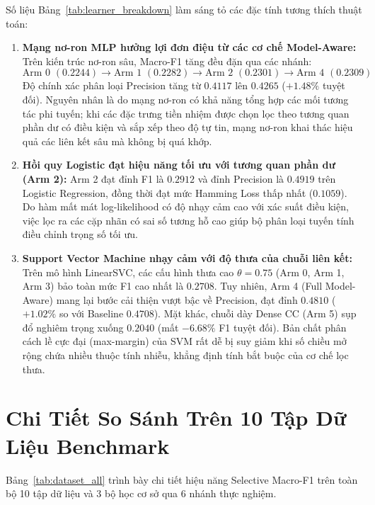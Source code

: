 \documentclass[11pt,a4paper]{article}
\begin{document}
Số liệu Bảng~\ref{tab:learner_breakdown} làm sáng tỏ các đặc tính tương thích thuật toán:
\begin{enumerate}[leftmargin=*]
  \item \textbf{Mạng nơ-ron MLP hưởng lợi đơn điệu từ các cơ chế Model-Aware:} 
  Trên kiến trúc nơ-ron sâu, Macro-F1 tăng đều đặn qua các nhánh:
  $$\text{Arm 0 } (0.2244) \to \text{Arm 1 } (0.2282) \to \text{Arm 2 } (0.2301) \to \text{Arm 4 } (\mathbf{0.2309})$$
  Độ chính xác phân loại Precision tăng từ $0.4117$ lên $\mathbf{0.4265}$ ($+1.48\%$ tuyệt đối). Nguyên nhân là do mạng nơ-ron có khả năng tổng hợp các mối tương tác phi tuyến; khi các đặc trưng tiền nhiệm được chọn lọc theo tương quan phần dư có điều kiện và sắp xếp theo độ tự tin, mạng nơ-ron khai thác hiệu quả các liên kết sâu mà không bị quá khớp.
  \item \textbf{Hồi quy Logistic đạt hiệu năng tối ưu với tương quan phần dư (Arm 2):}
  Arm 2 đạt đỉnh F1 là $\mathbf{0.2912}$ và đỉnh Precision là $\mathbf{0.4919}$ trên Logistic Regression, đồng thời đạt mức Hamming Loss thấp nhất ($0.1059$). Do hàm mất mát log-likelihood có độ nhạy cảm cao với xác suất điều kiện, việc lọc ra các cặp nhãn có sai số tương hỗ cao giúp bộ phân loại tuyến tính điều chỉnh trọng số tối ưu.
  \item \textbf{Support Vector Machine nhạy cảm với độ thưa của chuỗi liên kết:}
  Trên mô hình LinearSVC, các cấu hình thưa cao $\theta = 0.75$ (Arm 0, Arm 1, Arm 3) bảo toàn mức F1 cao nhất là $\mathbf{0.2708}$. Tuy nhiên, Arm 4 (Full Model-Aware) mang lại bước cải thiện vượt bậc về Precision, đạt đỉnh $\mathbf{0.4810}$ ($+1.02\%$ so với Baseline $0.4708$). Mặt khác, chuỗi dày Dense CC (Arm 5) sụp đổ nghiêm trọng xuống $0.2040$ (mất $-6.68\%$ F1 tuyệt đối). Bản chất phân cách lề cực đại (max-margin) của SVM rất dễ bị suy giảm khi số chiều mở rộng chứa nhiều thuộc tính nhiễu, khẳng định tính bắt buộc của cơ chế lọc thưa.
\end{enumerate}

\section{Chi Tiết So Sánh Trên 10 Tập Dữ Liệu Benchmark}

Bảng~\ref{tab:dataset_all} trình bày chi tiết hiệu năng Selective Macro-F1 trên toàn bộ 10 tập dữ liệu và 3 bộ học cơ sở qua 6 nhánh thực nghiệm.
\end{document}
